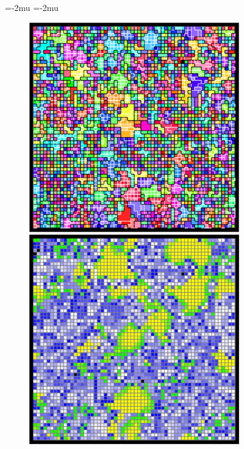 \begin{figure}[!htbp]
\begin{center}
\thinmuskip=-2mu
\thickmuskip=-2mu
\nulldelimiterspace=-1pt
\scriptspace=0pt
\begin{subfigure}[b]{\textwidth}
  \begin{minipage}{0.2\textwidth}
  \includegraphics[width=\textwidth]{img/source_hash=27061e1-dirty_emp_hash=1c7cb54-clean_title=channel_viz+treat=resource-even__channelsense-no__nlev-two+seed=1+update=50100}
  \end{minipage}
  \begin{minipage}{0.2\textwidth}
  \includegraphics[width=\textwidth]{img/source_hash=27061e1-dirty_emp_hash=1c7cb54-clean_title=stockpile_viz+treat=resource-even__channelsense-no__nlev-two+seed=1+update=50100}

\end{minipage}
\end{subfigure}
\end{center}
\end{figure}
